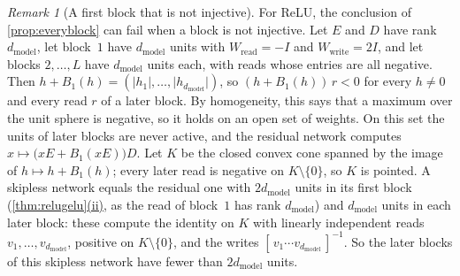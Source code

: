 \documentclass[10pt]{article}
\theoremstyle{definition}
\theoremstyle{remark}
\newtheorem{remark}[theorem]{Remark}
\newcommand{\Wread}{W_{\mathrm{read}}}
\newcommand{\Wwrite}{W_{\mathrm{write}}}
\newcommand{\dm}{d_{\mathrm{model}}}
\DeclareRobustCommand{\cpref}[2]{\hyperref[#1:#2]{\cref*{#1}(#2)}}
\begin{document}
\begin{remark}[A first block that is not injective]\label{rem:fold}
For ReLU, the conclusion of \cref{prop:everyblock} can fail when a block is not injective. Let $E$ and $D$ have rank $\dm$, let block~$1$ have $\dm$ units with $\Wread = -I$ and $\Wwrite = 2I$, and let blocks $2, \dots, L$ have $\dm$ units each, with reads whose entries are all negative. Then $h + B_1(h) = (\lvert h_1\rvert, \dots, \lvert h_{\dm}\rvert)$, so $(h + B_1(h))\,r < 0$ for every $h \neq 0$ and every read $r$ of a later block. By homogeneity, this says that a maximum over the unit sphere is negative, so it holds on an open set of weights. On this set the units of later blocks are never active, and the residual network computes $x \mapsto \big(xE + B_1(xE)\big)D$. Let $K$ be the closed convex cone spanned by the image of $h \mapsto h + B_1(h)$; every later read is negative on $K \setminus \{0\}$, so $K$ is pointed. A skipless network equals the residual one with $2\dm$ units in its first block (\cpref{thm:relugelu}{ii}, as the read of block~$1$ has rank $\dm$) and $\dm$ units in each later block: these compute the identity on $K$ with linearly independent reads $v_1, \dots, v_{\dm}$, positive on $K \setminus \{0\}$, and the writes $[\,v_1 \cdots v_{\dm}\,]^{-1}$. So the later blocks of this skipless network have fewer than $2\dm$ units.
\end{remark}

\propDimCount*
\end{document}
